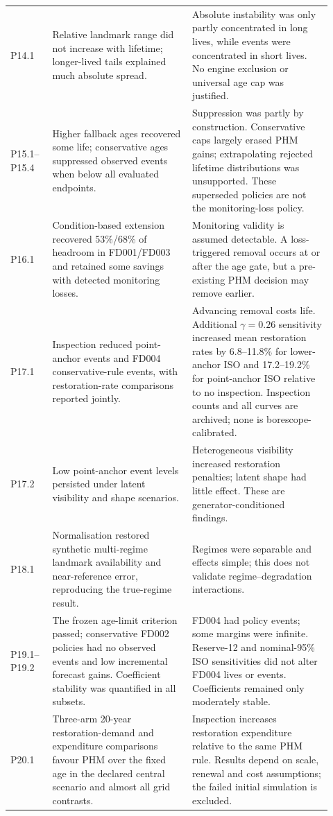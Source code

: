 \documentclass[12pt]{article}
\begin{document}
\begin{longtable}{@{}p{0.12\linewidth}p{0.40\linewidth}p{0.40\linewidth}@{}}
P14.1 & Relative landmark range did not increase with lifetime; longer-lived tails explained much absolute spread. & Absolute instability was only partly concentrated in long lives, while events were concentrated in short lives. No engine exclusion or universal age cap was justified. \\
P15.1--P15.4 & Higher fallback ages recovered some life; conservative ages suppressed observed events when below all evaluated endpoints. & Suppression was partly by construction. Conservative caps largely erased PHM gains; extrapolating rejected lifetime distributions was unsupported. These superseded policies are not the monitoring-loss policy. \\
P16.1 & Condition-based extension recovered 53\%/68\% of headroom in FD001/FD003 and retained some savings with detected monitoring losses. & Monitoring validity is assumed detectable. A loss-triggered removal occurs at or after the age gate, but a pre-existing PHM decision may remove earlier. \\
P17.1 & Inspection reduced point-anchor events and FD004 conservative-rule events, with restoration-rate comparisons reported jointly. & Advancing removal costs life. Additional $\gamma=0.26$ sensitivity increased mean restoration rates by 6.8--11.8\% for lower-anchor ISO and 17.2--19.2\% for point-anchor ISO relative to no inspection. Inspection counts and all curves are archived; none is borescope-calibrated. \\
P17.2 & Low point-anchor event levels persisted under latent visibility and shape scenarios. & Heterogeneous visibility increased restoration penalties; latent shape had little effect. These are generator-conditioned findings. \\
P18.1 & Normalisation restored synthetic multi-regime landmark availability and near-reference error, reproducing the true-regime result. & Regimes were separable and effects simple; this does not validate regime--degradation interactions. \\
P19.1--P19.2 & The frozen age-limit criterion passed; conservative FD002 policies had no observed events and low incremental forecast gains. Coefficient stability was quantified in all subsets. & FD004 had policy events; some margins were infinite. Reserve-12 and nominal-95\% ISO sensitivities did not alter FD004 lives or events. Coefficients remained only moderately stable. \\
P20.1 & Three-arm 20-year restoration-demand and expenditure comparisons favour PHM over the fixed age in the declared central scenario and almost all grid contrasts. & Inspection increases restoration expenditure relative to the same PHM rule. Results depend on scale, renewal and cost assumptions; the failed initial simulation is excluded. \\
\bottomrule
\end{longtable}
\normalsize
\end{document}
